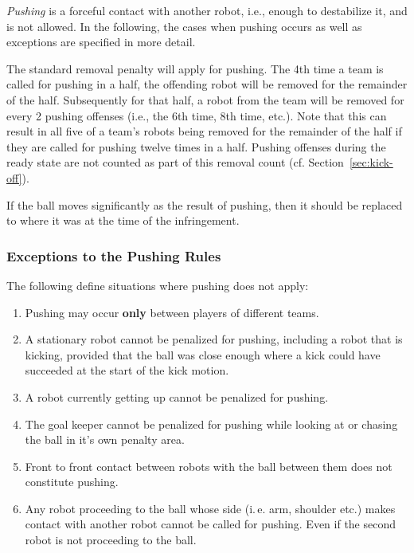 \documentclass[12pt]{article}
\newcommand{\ie}{\mbox{i.\,e.}\xspace}
\newcommand{\cf}{\mbox{cf.}\xspace}
\begin{document}
\emph{Pushing} is a forceful contact with another robot, i.e., enough to destabilize it, and is not allowed. In the following, the cases when pushing occurs as well as exceptions are specified in more detail.

The standard removal penalty will apply for pushing. The 4th time a team is called for pushing in a
half, the offending robot will be removed for the remainder of the half. Subsequently for that half,
a robot from the team will be removed for every 2 pushing offenses (i.e., the 6th time, 8th time, etc.).  Note that this can result in all five of a team's robots being removed for the remainder of the half if they are called for pushing twelve times in a half.  Pushing offenses during the ready state are not counted as part of this removal count (\cf Section~\ref{sec:kick-off}).

If the ball moves significantly as the result of pushing, then it should be replaced to where it was at the time of the infringement.

\subsubsection{Exceptions to the Pushing Rules}
\label{sec:situations_no_pushing}

The following define situations where pushing does not apply:

\begin{enumerate}
	\item Pushing may occur \textbf{only} between players of different teams.
	\item A stationary robot cannot be penalized for pushing, including a robot that is kicking, provided that the ball was close enough where a kick could have succeeded at the start of the kick motion.
	\item A robot currently getting up cannot be penalized for pushing.
	\item The goal keeper cannot be penalized for pushing while looking at or chasing the ball in it's own penalty area.
	\item Front to front contact between robots with the ball between them does not constitute pushing.
	\item Any robot proceeding to the ball whose side (\ie arm, shoulder etc.) makes contact with another robot cannot be called for pushing. Even if the second robot is not proceeding to the ball.
\end{enumerate}
\end{document}
